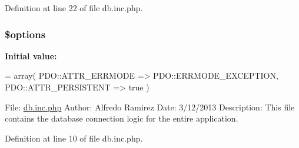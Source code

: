 Definition at line 22 of file db.\-inc.\-php.

\hypertarget{db_8inc_8php_a011800c63ece4cbbfa77136a20607023}{
\subsubsection[{\$options}]{\setlength{\rightskip}{0pt plus 5cm}\$options}}\label{db_8inc_8php_a011800c63ece4cbbfa77136a20607023}
{\bfseries Initial value\-:}
\begin{DoxyCode}
= array(
  PDO::ATTR\_ERRMODE => PDO::ERRMODE\_EXCEPTION,
  PDO::ATTR\_PERSISTENT => \textcolor{keyword}{true}
)
\end{DoxyCode}
File\-: \hyperlink{db_8inc_8php}{db.\-inc.\-php} Author\-: Alfredo Ramirez Date\-: 3/12/2013 Description\-: This file contains the database connection logic for the entire application. 

Definition at line 10 of file db.\-inc.\-php.

